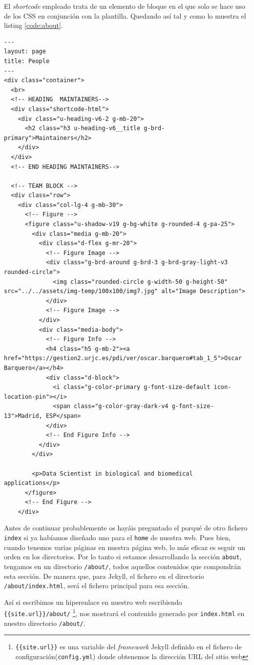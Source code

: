 El \textit{shortcode} empleado trata de un elemento de bloque en el que solo se hace uso de los CSS en conjunción con la plantilla. Quedando así tal y como lo muestra el listing \ref{code:about}. 
\begin{lstlisting}[style=htmlcssjs,caption=index.html de About,label={code:about}]
---
layout: page
title: People
---
<div class="container">
  <br>
  <!-- HEADING  MAINTAINERS-->
  <div class="shortcode-html">
    <div class="u-heading-v6-2 g-mb-20">
      <h2 class="h3 u-heading-v6__title g-brd-primary">Maintainers</h2>
    </div>
  </div>
  <!-- END HEADING MAINTAINERS-->

  <!-- TEAM BLOCK -->
  <div class="row">
    <div class="col-lg-4 g-mb-30">
      <!-- Figure -->
      <figure class="u-shadow-v19 g-bg-white g-rounded-4 g-pa-25">
        <div class="media g-mb-20">
          <div class="d-flex g-mr-20">
            <!-- Figure Image -->
            <div class="g-brd-around g-brd-3 g-brd-gray-light-v3 rounded-circle">
              <img class="rounded-circle g-width-50 g-height-50" src="../../assets/img-temp/100x100/img7.jpg" alt="Image Description">
            </div>
            <!-- Figure Image -->
          </div>
          <div class="media-body">
            <!-- Figure Info -->
            <h4 class="h5 g-mb-2"><a href="https://gestion2.urjc.es/pdi/ver/oscar.barquero#tab_1_5">Oscar Barquero</a></h4>
            <div class="d-block">
              <i class="g-color-primary g-font-size-default icon-location-pin"></i>
              <span class="g-color-gray-dark-v4 g-font-size-13">Madrid, ESP</span>
            </div>
            <!-- End Figure Info -->
          </div>
        </div>

        <p>Data Scientist in biological and biomedical applications</p>
      </figure>
      <!-- End Figure -->
    </div>
\end{lstlisting}

Antes de continuar probablemente os hayáis preguntado el porqué de otro fichero \texttt{index} si ya habíamos diseñado uno para el \texttt{home} de nuestra web. Pues bien,  cuando tenemos varias páginas en nuestra página web, lo más eficaz es seguir un orden en los directorios. Por lo tanto si estamos desarrollando la sección \texttt{about}, tengamos en un directorio \texttt{/about/}, todos aquellos contenidos que compondrán esta sección. De manera que, para Jekyll, el fichero en el directorio \texttt{/about/index.html}, será el fichero principal para esa sección.

Así si escribimos un hiperenlace en nuestro web escribiendo \texttt{\{\{site.url\}\}/about/} \footnote{\texttt{\{\{site.url\}\}} es una variable del \textit{framework} Jekyll definido en el fichero de configuración(\texttt{config.yml}) donde obtenemos la dirección URL del sitio web}, nos mostrará el contenido generado por \texttt{index.html} en nuestro directorio \texttt{/about/}.

